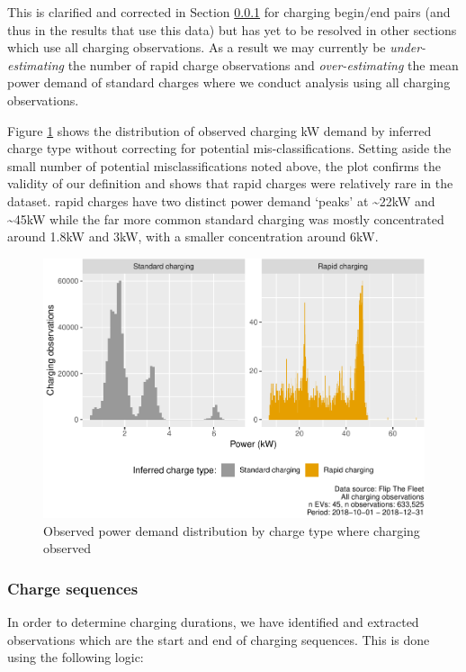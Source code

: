 \documentclass[]{article}
\begin{document}
This is clarified and corrected in Section \ref{codeSequences} for charging begin/end pairs (and thus in the results that use this data) but has yet to be resolved in other sections which use all charging observations. As a result we may currently be \emph{under-estimating} the number of rapid charge observations and \emph{over-estimating} the mean power demand of standard charges where we conduct analysis using all charging observations.

Figure \ref{fig:obsPower} shows the distribution of observed charging kW demand by inferred charge type without correcting for potential mis-classifications. Setting aside the small number of potential misclassifications noted above, the plot confirms the validity of our definition and shows that rapid charges were relatively rare in the dataset. rapid charges have two distinct power demand `peaks' at \textasciitilde{}22kW and \textasciitilde{}45kW while the far more common standard charging was mostly concentrated around 1.8kW and 3kW, with a smaller concentration around 6kW.

\begin{figure}
\centering
\includegraphics{EVBB_report_v1_files/figure-latex/obsPower-1.pdf}
\caption{\label{fig:obsPower}Observed power demand distribution by charge type where charging observed}
\end{figure}

\hypertarget{codeSequences}{%
\subsubsection{Charge sequences}\label{codeSequences}}

In order to determine charging durations, we have identified and extracted observations which are the start and end of charging sequences. This is done using the following logic:
\end{document}
